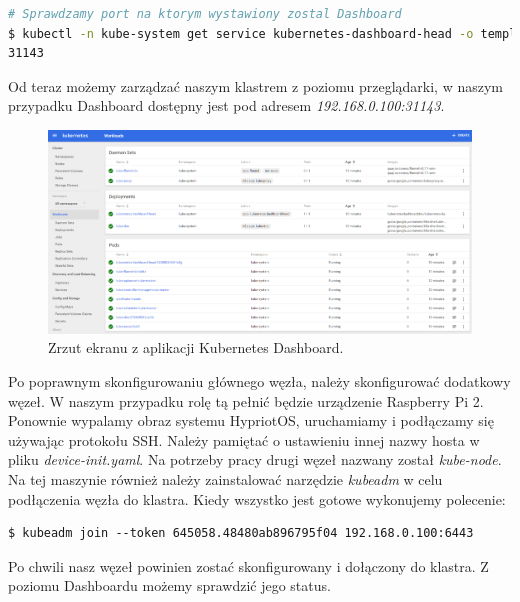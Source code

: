\documentclass[12pt]{report}
\begin{document}
{\begin{lstlisting}[language=bash]
# Sprawdzamy port na ktorym wystawiony zostal Dashboard
$ kubectl -n kube-system get service kubernetes-dashboard-head -o template --template="{{ (index .spec.ports 0).nodePort }}"
31143
\end{lstlisting}

Od teraz możemy zarządzać naszym klastrem z poziomu przeglądarki, w naszym przypadku Dashboard dostępny jest pod adresem \textit{192.168.0.100:31143}.

\begin{figure}[h]
	\centering
	\includegraphics[width=1\textwidth]{images/dashboard.png}
	\caption{Zrzut ekranu z aplikacji Kubernetes Dashboard.}
\end{figure}
\FloatBarrier

Po poprawnym skonfigurowaniu głównego węzła, należy skonfigurować dodatkowy węzeł. W naszym przypadku rolę tą pełnić będzie urządzenie Raspberry Pi 2. Ponownie wypalamy obraz systemu HypriotOS, uruchamiamy i podłączamy się używając protokołu SSH. Należy pamiętać o ustawieniu innej nazwy hosta w pliku \textit{device-init.yaml}. Na potrzeby pracy drugi węzeł nazwany został \textit{kube-node}. Na tej maszynie również należy zainstalować narzędzie \textit{kubeadm} w celu podłączenia węzła do klastra. Kiedy wszystko jest gotowe wykonujemy polecenie:

\begin{lstlisting}
$ kubeadm join --token 645058.48480ab896795f04 192.168.0.100:6443
\end{lstlisting}

Po chwili nasz węzeł powinien zostać skonfigurowany i dołączony do klastra. Z poziomu Dashboardu możemy sprawdzić jego status.

}
\end{document}

